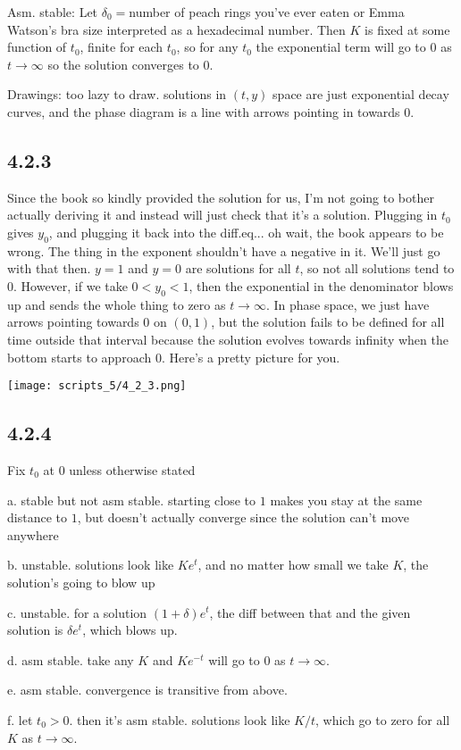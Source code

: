 \documentclass{article}
\begin{document}
Asm. stable: Let $\delta_0=$number of peach rings you've ever eaten or Emma Watson's bra size interpreted as a hexadecimal number. Then $K$ is fixed at some function of $t_0$, finite for each $t_0$, so for any $t_0$ the exponential term will go to $0$ as $t\to\infty$ so the solution converges to $0$.

Drawings: too lazy to draw. solutions in $(t,y)$ space are just exponential decay curves, and the phase diagram is a line with arrows pointing in towards $0$.
\subsection*{4.2.3}
Since the book so kindly provided the solution for us, I'm not going to bother actually deriving it and instead will just check that it's a solution. Plugging in $t_0$ gives $y_0$, and plugging it back into the diff.eq... oh wait, the book appears to be wrong. The thing in the exponent shouldn't have a negative in it. We'll just go with that then. $y=1$ and $y=0$ are solutions for all $t$, so not all solutions tend to $0$. However, if we take $0<y_0<1$, then the exponential in the denominator blows up and sends the whole thing to zero as $t\to\infty$. In phase space, we just have arrows pointing towards $0$ on $(0,1)$, but the solution fails to be defined for all time outside that interval because the solution evolves towards infinity when the bottom starts to approach $0$. Here's a pretty picture for you.

\texttt{[image: scripts\_5/4\_2\_3.png]}
\subsection*{4.2.4}
Fix $t_0$ at $0$ unless otherwise stated

a. stable but not asm stable. starting close to $1$ makes you stay at the same distance to $1$, but doesn't actually converge since the solution can't move anywhere

b. unstable. solutions look like $Ke^t$, and no matter how small we take $K$, the solution's going to blow up

c. unstable. for a solution $(1+\delta)e^t$, the diff between that and the given solution is $\delta e^t$, which blows up.

d. asm stable. take any $K$ and $Ke^{-t}$ will go to $0$ as $t\to\infty$.

e. asm stable. convergence is transitive from above.

f. let $t_0>0$. then it's asm stable. solutions look like $K/t$, which go to zero for all $K$ as $t\to\infty$.
\end{document}
